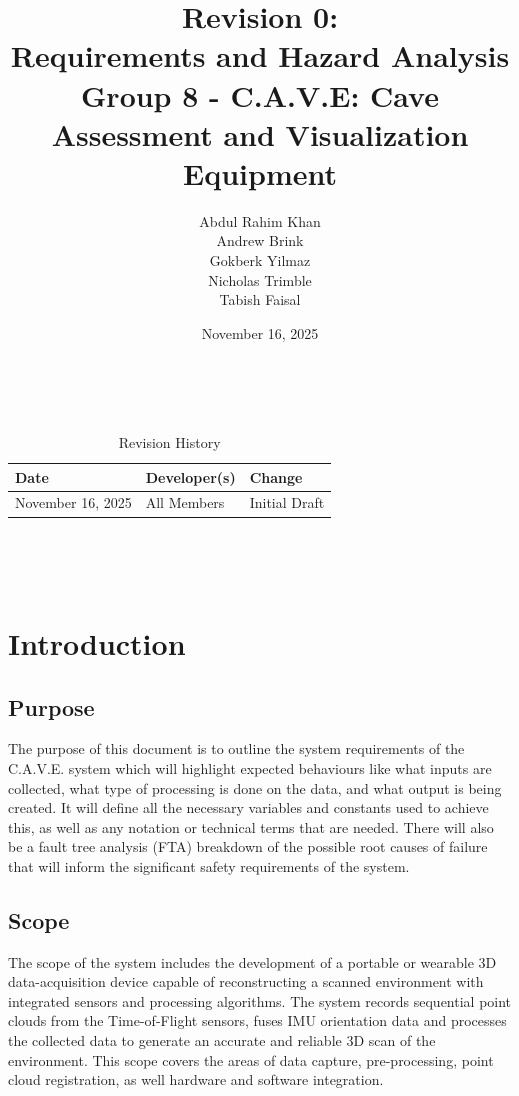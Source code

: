 \documentclass[11pt]{article}
\title{\textbf{Revision 0: \\Requirements and Hazard Analysis \\ \large Group 8 - C.A.V.E: Cave Assessment and Visualization Equipment}}
\author{Abdul Rahim Khan \\ Andrew Brink \\ Gokberk Yilmaz \\ Nicholas Trimble \\ Tabish Faisal}
\date{November 16, 2025}
\begin{document}
\maketitle

~\newpage

\setcounter{table}{-1}
	\begin{table}[hp]
		\caption{Revision History} \label{TblRevisionHistory}
		\begin{tabularx}{\textwidth}{llX}
			\toprule
			\textbf{Date} & \textbf{Developer(s)} & \textbf{Change}\\
			\midrule
			November 16, 2025 & All Members & Initial Draft\\
			\bottomrule
		\end{tabularx}
	\end{table}

~\newpage

\tableofcontents

~\newpage

\setcounter{table}{0}

	\section{Introduction}
		\subsection{Purpose}
		
		The purpose of this document is to outline the system requirements of the C.A.V.E. system which will highlight expected behaviours like what inputs are collected, what type of processing is done on the data, and what output is being created. It will define all the necessary variables and constants used to achieve this, as well as any notation or technical terms that are needed. There will also be a fault tree analysis (FTA) breakdown of the possible root causes of failure that will inform the significant safety requirements of the system. 
		
		\subsection{Scope}
		The scope of the system includes the development of a portable or wearable 3D data-acquisition device capable of reconstructing a scanned environment with integrated sensors and processing algorithms. The system records sequential point clouds from the Time-of-Flight sensors, fuses IMU orientation data and processes the collected data to generate an accurate and reliable 3D scan of the environment. This scope covers the areas of data capture, pre-processing, point cloud registration, as well hardware and software integration.
		
\end{document}
